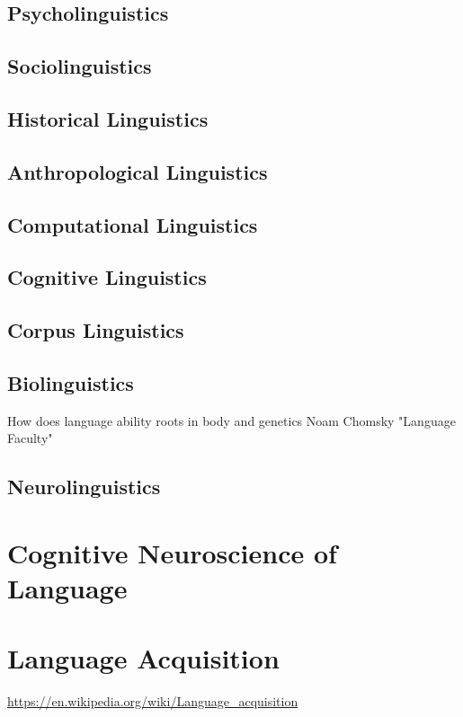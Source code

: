    
    \subsection{Psycholinguistics}
    
    
    \subsection{Sociolinguistics}
    
    
    \subsection{Historical Linguistics}
    
    
    \subsection{Anthropological Linguistics}
    
    
    \subsection{Computational Linguistics}
    
    
    \subsection{Cognitive Linguistics}
    
    
    \subsection{Corpus Linguistics}
    
    
    \subsection{Biolinguistics}
        How does language ability roots in body and genetics
        Noam Chomsky "Language Faculty"
    
    
    \subsection{Neurolinguistics}
    
    
\section{Cognitive Neuroscience of Language}


\section{Language Acquisition}
    \url{https://en.wikipedia.org/wiki/Language_acquisition}
    
%    
%    